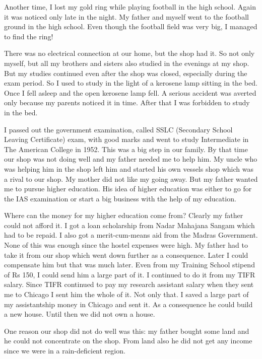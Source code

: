 Another time, I lost my gold ring while playing football in the high 
school. Again it was noticed only late in the night. My father and 
myself went to the football ground in the high school. Even though the 
football field was very big, I managed to find the ring!

There was no electrical connection at our home, but the shop had it. So 
not only myself, but all my brothers and sisters also studied in the 
evenings at my shop. But my studies continued even after the shop was 
closed, especially during the exam period. So I used to study in the 
light of a kerosene lamp sitting in the bed. Once I fell asleep and the 
open kerosene lamp fell. A serious accident was averted only because my 
parents noticed it in time. After that I was forbidden to study in the 
bed.
 
I passed out the government examination, called SSLC (Secondary School 
Leaving Certificate) exam, with good marks and went to study 
Intermediate in The American College in 1952. This was a big step in our 
family. By that time our shop was not doing well and my father needed me 
to help him. My uncle who was helping him in the shop left him and 
started his own vessels shop which was a rival to our shop. My mother 
did not like my going away. But my father wanted me to pursue higher 
education. His idea of higher education was either to go for the IAS 
examination or start a big business with the help of my education.

Where can the money for my higher education come from? Clearly my father 
could not afford it. I got a loan scholarship from Nadar Mahajana Sangam 
which had to be repaid. I also got a merit-cum-means aid from the Madras 
Government. None of this was enough since the hostel expenses were high. 
My father had to take it from our shop which went down further as a 
consequence. Later I could compensate him but that was much later. Even 
from my Training School stipend of Rs 150, I could send him a large part 
of it. I continued to do it from my TIFR salary. Since TIFR continued to 
pay my research assistant salary when they sent me to Chicago I sent him 
the whole of it. Not only that. I saved a large part of my assistantship 
money in Chicago and sent it. As a consequence he could build a new 
house. Until then we did not own a house.

One reason our shop did not do well was this: my father bought some land 
and he could not concentrate on the shop. From land also he did not get 
any income since we were in a rain-deficient region.


